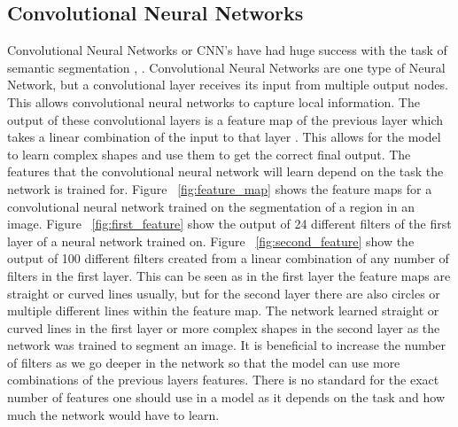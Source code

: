 \subsection{Convolutional Neural Networks}
Convolutional Neural Networks or CNN's have had huge success with the task of semantic segmentation \cite{Girshick_2014_CVPR}, \cite{Long_2015}. 
Convolutional Neural Networks are one type of Neural Network, but a convolutional layer receives its input from multiple output nodes.
This allows convolutional neural networks to capture local information. 
The output of these convolutional layers is a feature map of the previous layer which takes a linear combination of the input to that layer \cite{Lee:2011:ULH:2001269.2001295}.
This allows for the model to learn complex shapes and use them to get the correct final output. 
The features that the convolutional neural network will learn depend on the task the network is trained for.
Figure ~\ref{fig:feature_map} shows the feature maps for a convolutional neural network trained on the segmentation of a region in an image. 
Figure ~\ref{fig:first_feature} show the output of 24 different filters of the first layer of a neural network trained on. Figure ~\ref{fig:second_feature} show the output of 100 different filters created from a linear combination of any number of filters in the first layer. 
This can be seen as in the first layer the feature maps are straight or curved lines usually, but for the second layer there are also circles or multiple different lines within the feature map.
The network learned straight or curved lines in the first layer or more complex shapes in the second layer as the network was trained to segment an image.
It is beneficial to increase the number of filters as we go deeper in the network so that the model can use more combinations of the previous layers features. 
There is no standard for the exact number of features one should use in a model as it depends on the task and how much the network would have to learn.

